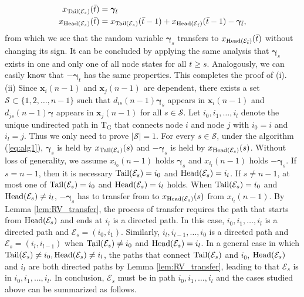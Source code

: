 \documentclass[a4paper, 11pt]{article}
\newcommand{\1}{\mathbf{1}}
\newcommand{\asf}{\mathcal{E}}
\newcommand{\xb}{\mathbf{x}}
\newcommand{\Head}{\textnormal{Head}}
\newcommand{\Tail}{\textnormal{Tail}}
\newcommand{\mG}{\mathrm{G}}
\newcommand{\mT}{\mathrm{T}}
\newcommand{\gammab}{{\bm \gamma}}
\begin{document}
\begin{equation}\notag
\begin{aligned}
x_{\Tail(\asf_{s})}(\bar{t}) &= \gammab_{\bar{t}}\\
x_{\Head(\asf_{s})}(\bar{t}) &= x_{\Tail(\asf_{s})}(\bar{t}-1) + x_{\Head(\asf_{\bar{t}})}(\bar{t}-1) - \gammab_{\bar{t}},
\end{aligned}
\end{equation}
from which we see that the random variable $\gammab_{s}$ transfers to $x_{\Head(\asf_{\bar{t}})}(\bar{t})$ without changing its sign. It can be concluded by applying the same analysis that $\gammab_s$ exists in one and only one of all node states for all $t\ge s$. Analogously, we can easily know that $-\gammab_{\hat{t}}$ has the same properties. This completes the proof of (i).\\
(ii) Since $\xb_i(n-1 )$ and $\xb_j(n-1 )$ are dependent, there exists a set $\mathcal{S}\subset\{1,2,\dots,n-1 \}$ such that $d_{is}(n-1 )\gammab_s$ appears in $\xb_i(n-1 )$ and $d_{js}(n-1 )\gammab$ appears in $\xb_j(n-1 )$ for all $s\in\mathcal{S}$. Let $i_0,i_1,\dots,i_l$ denote the unique undirected path in $\mT_\mG$ that connects node $i$ and node $j$ with $i_0=i$ and $i_l=j$. Thus we only need to prove $|\mathcal{S}|=1$. For every $s\in\mathcal{S}$, under the algorithm (\ref{eq:alg1}), $\gammab_s$ is held by $x_{\Tail(\asf_s)}(s)$ and $-\gammab_s$ is held by $x_{\Head(\asf_s)}(s)$. Without loss of generality, we assume $x_{i_0}(n-1 )$ holds $\gammab_s$ and $x_{i_l}(n-1 )$ holds $-\gammab_s$. If $s=n-1 $, then it is necessary $\Tail(\asf_s)=i_0$ and $\Head(\asf_s)=i_l$. If $s\neq n-1 $, at most one of $\Tail(\asf_s)=i_0$ and $\Head(\asf_s)=i_l$ holds. When $\Tail(\asf_s)=i_0$ and $\Head(\asf_s)\neq i_l$, $-\gammab_s$ has to transfer from to $x_{\Head(\asf_s)}(s)$ from $x_{i_l}(n-1 )$. By Lemma \ref{lem:RV_transfer}, the process of transfer requires the path that starts from $\Head(\asf_s)$ and ends at $i_l$ is a directed path. In this case, $i_0,i_1,\dots,i_l$ is a directed path and $\asf_s=(i_0,i_1)$. Similarly, $i_l,i_{l-1},\dots,i_0$ is a directed path and $\asf_s=(i_l,i_{l-1})$ when $\Tail(\asf_s)\neq i_0$ and $\Head(\asf_s)= i_l$. In a general case in which $\Tail(\asf_s)\neq i_0,\Head(\asf_s)\neq i_l$, the paths that connect $\Tail(\asf_s)$ and $i_0$, $\Head(\asf_s)$ and $i_l$ are both directed paths by Lemma \ref{lem:RV_transfer}, leading to that $\asf_s$ is in $i_0,i_1,\dots,i_l$. In conclusion, $\asf_s$ must be in path $i_0,i_1,\dots,i_l$ and the cases studied above can be summarized as follows.
\end{document}
